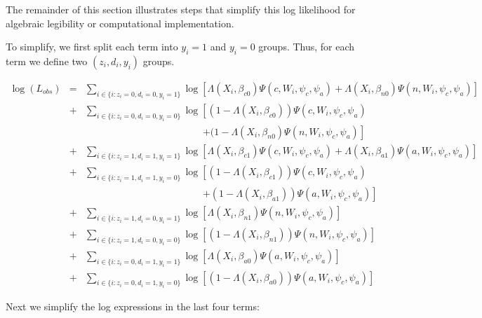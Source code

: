 \documentclass[12pt]{article}
\begin{document}
The remainder of this section illustrates steps that simplify this log
likelihood for algebraic legibility or computational implementation.  

To simplify, we first split each term into $y_i =1$ and $y_i=0$
groups.  Thus, for each term we define two $(z_i,d_i,y_i)$ groups.

\begin{eqnarray*}
\log(L_{obs}) & = & \sum_{i \in \{i:z_i=0,d_i=0,y_i=1\}} \log\left[
\Lambda(X_i,\beta_{c0}) \Psi(c, W_i,
\psi_c,\psi_a) + \Lambda(X_i,\beta_{n0}) \Psi(n,
W_i, \psi_c,\psi_a) \right] \\
& + & \sum_{i \in \{i:z_i=0,d_i=0,y_i=0\}} \log\left[
(1-\Lambda(X_i,\beta_{c0}))  \Psi(c, W_i,
\psi_c,\psi_a) \right. \\
&  & \qquad \qquad\qquad \qquad \qquad \qquad \left. +
(1-\Lambda(X_i,\beta_{n0}) \Psi(n, W_i, \psi_c,\psi_a) \right] \\
& + & \sum_{i \in \{i:z_i=1,d_i=1,y_i=1\}} \log\left[
\Lambda(X_i,\beta_{c1}) \Psi(c, W_i,
\psi_c,\psi_a) + \Lambda(X_i,\beta_{a1}) \Psi(a,
W_i, \psi_c,\psi_a) \right] \\
& + & \sum_{i \in \{i:z_i=1,d_i=1,y_i=0\}} \log\left[
(1-\Lambda(X_i,\beta_{c1})) \Psi(c, W_i,
\psi_c,\psi_a) \right. \\
&  & \qquad \qquad\qquad \qquad \qquad \qquad \left. +
(1-\Lambda(X_i,\beta_{a1})) \Psi(a, W_i, \psi_c,\psi_a) \right] \\
& + & \sum_{i \in \{i:z_i=1,d_i=0, y_i=1\}} \log\left[
\Lambda(X_i,\beta_{n1}) \Psi(n, W_i, \psi_c,\psi_a) \right] \\
& + & \sum_{i \in \{i:z_i=1,d_i=0, y_i=0\}} \log\left[
(1-\Lambda(X_i,\beta_{n1})) \Psi(n, W_i, \psi_c,\psi_a) \right] \\
& + & \sum_{i \in \{i:z_i=0,d_i=1, y_i=1\}} \log\left[ 
\Lambda(X_i,\beta_{a0}) \Psi(a, W_i, \psi_c,\psi_a) \right] \\
& + & \sum_{i \in \{i:z_i=0,d_i=1, y_i=0\}} \log\left[ 
(1-\Lambda(X_i,\beta_{a0})) \Psi(a, W_i, \psi_c,\psi_a) \right] 
\end{eqnarray*}

Next we simplify the log expressions in the last four terms:
\end{document}
